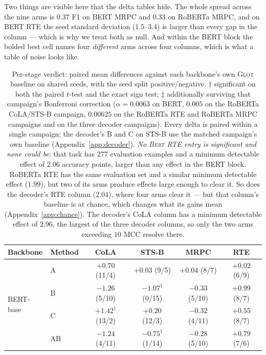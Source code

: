 \documentclass{article}
\begin{document}
Two things are visible here that the delta tables hide. The whole spread across
the nine arms is $0.37$ F1 on BERT MRPC and $0.33$ on RoBERTa MRPC, and on BERT
RTE the seed standard deviation ($1.5$--$3.4$) is larger than every gap in the
column --- which is why we treat both as null. And within the BERT block the
bolded best cell names four \emph{different} arms across four columns, which is
what a table of noise looks like.

\begin{table}[h]
\caption{Per-stage verdict: paired mean differences against each backbone's own
\textsc{Glot} baseline on shared seeds, with the seed split positive/negative.
$\dagger$ significant on both the paired $t$-test and the exact sign test;
$\ddagger$ additionally surviving that campaign's Bonferroni correction
($\alpha=0.0063$ on BERT, $0.005$ on the RoBERTa CoLA/STS-B campaign,
$0.00625$ on the RoBERTa RTE and RoBERTa MRPC campaigns and on the three
decoder campaigns). Every delta is paired within a single campaign; the
decoder's B and C on STS-B use the matched campaign's own baseline
(Appendix~\ref{app:decoder}).
\emph{No \textsc{Bert} RTE entry is significant and none could be}: that task has
$277$ evaluation examples and a minimum detectable effect of $2.06$ accuracy
points, larger than any effect in the BERT block. RoBERTa RTE has the same
evaluation set and a similar minimum detectable effect ($1.99$), but two of its
arms produce effects large enough to clear it. So does the decoder's RTE column
($2.04$), where four arms clear it --- but that column's baseline is at chance,
which changes what its gains mean (Appendix~\ref{app:chance}). The decoder's
CoLA column has a minimum detectable effect of $2.96$, the largest of the three
decoder columns, so only the two arms exceeding $10$ MCC resolve there.}
\label{tab:verdict}
\begin{center}
\footnotesize
\setlength{\tabcolsep}{4pt}
\begin{tabular}{llcccc}
\toprule
Backbone & Method & CoLA & STS-B & MRPC & RTE \\
\midrule
\multirow{8}{*}{BERT-base}
 & A   & $+0.70$ (11/4) & $+0.03$ (9/5) & $+0.04$ (8/7) & $+0.02$ (6/9) \\
 & B   & $-1.26$ (5/10) & $-1.07^{\ddagger}$ (0/15) & $-0.33$ (5/10) & $+0.99$ (8/7) \\
 & C   & $\mathbf{+1.42}^{\dagger}$ (13/2) & $+0.20$ (12/3) & $-0.32$ (4/11) & $+0.55$ (8/7) \\
 & AB  & $-1.24$ (4/11) & $-0.75^{\ddagger}$ (1/14) & $-0.28$ (5/10) & $+0.79$ (7/6) \\

\end{tabular}
\end{center}
\end{table}
\end{document}
